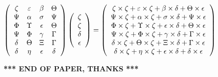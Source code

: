\documentclass[12pt]{article}
\begin{document}
$  %
 \left( \begin{array}
 {
 c
 c
 c
 c
 }
                    \zeta & 
 \varepsilon & 
 \beta & 
 \Theta \\ 
 \Psi & 
 \alpha & 
 \sigma & 
 \Psi \\ 
 \Phi & 
 \Upsilon & 
 \epsilon & 
 \Theta \\ 
 \Psi & 
 \Phi & 
 \gamma & 
 \Gamma \\ 
 \delta & 
 \Theta & 
                    \Xi & 
 \Gamma \\ 
 \delta & 
 \eta & 
 \epsilon & 
 \delta
 \end{array} \right)
 \left( \begin{array}
 {
 c
 }
                    \zeta \\ 
                    \zeta \\ 
 \delta \\ 
 \epsilon
 \end{array} \right)
=
  \left( \begin{array}
 {
 c
 }
                    \zeta \times                     \zeta   +  \varepsilon \times                     \zeta   +  \beta \times  \delta   +  \Theta \times  \epsilon \\ 
 \Psi \times                     \zeta   +  \alpha \times                     \zeta   +  \sigma \times  \delta   +  \Psi \times  \epsilon \\ 
 \Phi \times                     \zeta   +  \Upsilon \times                     \zeta   +  \epsilon \times  \delta   +  \Theta \times  \epsilon \\ 
 \Psi \times                     \zeta   +  \Phi \times                     \zeta   +  \gamma \times  \delta   +  \Gamma \times  \epsilon \\ 
 \delta \times                     \zeta   +  \Theta \times                     \zeta   +                     \Xi \times  \delta   +  \Gamma \times  \epsilon \\ 
 \delta \times                     \zeta   +  \eta \times                     \zeta   +  \epsilon \times  \delta   +  \delta \times  \epsilon
 \end{array} \right)
$
 
 
 
   
   
 \vspace{0.2in}
 
   
   
   
   
\vspace{1.0in} 
{\textbf{\large{ *** END OF PAPER, THANKS *** }}} 
   
\end{document}
